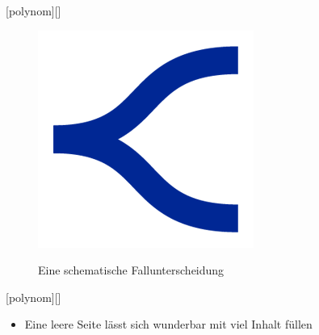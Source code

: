 \documentclass[t]{beamer}
\begin{document}
[polynom][]
\begin{frame}
  \vfill
  \begin{figure}
    \centering
    \includegraphics{bracket.png}\label{fig:fallunterscheidung}
    \caption{\fontsize{16pt}{24pt}\selectfont\centering Eine schematische Fallunterscheidung}
  \end{figure}
  \vfill
\end{frame}

[polynom][]
\begin{frame}
  \begin{itemize}
    \item Eine leere Seite lässt sich wunderbar mit viel Inhalt füllen
  \end{itemize}
\end{frame}
\end{document}
